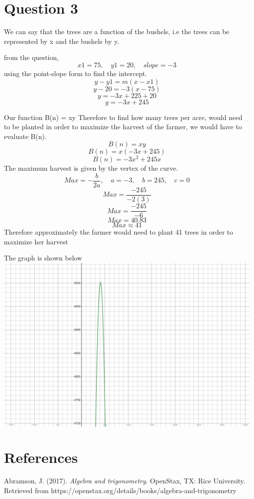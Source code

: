 \documentclass{article}
\begin{document}
\section*{Question 3}
We can say that the trees are a function of the bushels, i.e 
the trees can be represented by x and the bushels by y.

from the question, $${x1=75, \quad y1=20 , \quad slope =-3 }$$
using the point-slope form to find the intercept.
$${y-y1 = m(x-x1)}$$
$${y-20 = -3(x-75)}$$
$${y = -3x+225+20}$$
$${y = -3x + 245}$$

Our function B(n) = xy
Therefore to find how many trees per acre, would need to be planted in order to maximize the harvest of the farmer, we would have to evaluate B(n). 
$${B(n)=xy}$$
$${B(n)= x(-3x + 245) }$$
$${B(n)= -3x^2 + 245x}$$
The maximum harvest is given by the vertex of the curve.
$${Max= -\frac{b}{2a},\quad a=-3, \quad b=245, \quad c = 0}$$
$${Max= \frac{-245}{-2(3)}}$$
$${Max= \frac{-245}{-6}}$$
$${Max = 40.83}$$
$${Max \approx 41}$$
Therefore approximately the farmer would need to plant 41 trees in order to maximize her harvest

The graph is shown below\\
\includegraphics[scale = 0.1]{3b}

\section*{References}
Abramson, J. (2017). \textit{Algebra and trigonometry}. OpenStax, TX: Rice University. Retrieved
from https://openstax.org/details/books/algebra-and-trigonometry
\end{document}
